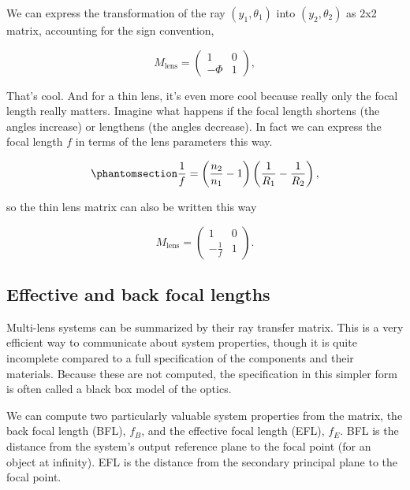 \documentclass[
  letterpaper,
]{book}
\begin{document}
\begin{tcolorbox}
We can express the transformation of the ray \((y_1, \theta_1)\) into
\((y_2, \theta_2)\) as 2x2 matrix, accounting for the sign convention,

\[
M_{\text{lens}}
=
\begin{pmatrix}
1 & 0 \\
-\Phi & 1
\end{pmatrix},
\]

That's cool. And for a thin lens, it's even more cool because really
only the focal length really matters. Imagine what happens if the focal
length shortens (the angles increase) or lengthens (the angles
decrease). In fact we can express the focal length \(f\) in terms of the
lens parameters this way.

\begin{equation}\phantomsection\label{eq-f-ior}{
\frac{1}{f} =  \left(\frac{n_{2}}{n_{1}} - 1\right)
\left(\frac{1}{R_{1}} - \frac{1}{R_{2}}\right),
}\end{equation}

so the thin lens matrix can also be written this way

\[
M_{\text{lens}}
=
\begin{pmatrix}
1 & 0 \\
-\tfrac{1}{f} & 1
\end{pmatrix}.
\]

\end{tcolorbox}

\subsection{Effective and back focal
lengths}\label{effective-and-back-focal-lengths}

Multi-lens systems can be summarized by their ray transfer matrix. This
is a very efficient way to communicate about system properties, though
it is quite incomplete compared to a full specification of the
components and their materials. Because these are not computed, the
specification in this simpler form is often called a black box model of
the optics.

We can compute two particularly valuable system properties from the
matrix, the back focal length (BFL), \(f_B\), and the effective focal
length (EFL), \(f_E\). BFL is the distance from the system's output
reference plane to the focal point (for an object at infinity). EFL is
the distance from the secondary principal plane to the focal point.
\end{document}
